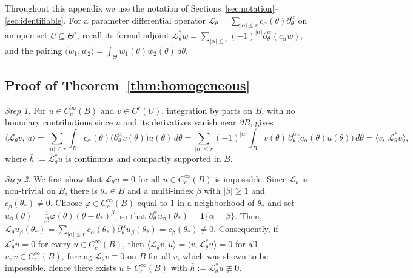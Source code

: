 \documentclass[11pt,twoside]{article} %
\begin{document}
Throughout this appendix we use the notation of Sections~\ref{sec:notation}--\ref{sec:identifiable}.
For a parameter differential operator $\mathcal L_\theta=\sum_{|\alpha|\le r}c_\alpha(\theta)\partial^\alpha_\theta$
on an open set $U\subseteq\Theta^\circ$, recall its formal adjoint
$\mathcal L^*_\theta w=\sum_{|\alpha|\le r}(-1)^{|\alpha|}\partial^\alpha_\theta(c_\alpha w)$,
and the pairing $\langle w_1,w_2\rangle=\int_\Theta w_1(\theta)w_2(\theta)\,d\theta$.

\subsection{Proof of Theorem~\ref{thm:homogeneous}}
\label{app:proof:thm_homogeneous}


\emph{Step 1.}
For $u\in C_c^\infty(B)$ and $v\in C^r(U)$, integration by parts on $B$, with no
boundary contributions since $u$ and its derivatives vanish near $\partial B$, gives
\begin{equation*}
    \langle \mathcal L_\theta v,\,u\rangle
    =\sum_{|\alpha|\le r}\int_B c_\alpha(\theta)\big(\partial^\alpha_\theta v(\theta)\big)u(\theta)\,d\theta
    =\sum_{|\alpha|\le r}(-1)^{|\alpha|}\int_B v(\theta)\,\partial^\alpha_\theta\!\big(c_\alpha(\theta)u(\theta)\big)\,d\theta
    =\langle v,\,\mathcal L^*_\theta u\rangle,
\end{equation*}
%
where $\bar h:=\mathcal L^*_\theta u$ is continuous and compactly supported in $B$.

\vspace{0.5 em}
\noindent
\emph{Step 2.}
We first show that $\mathcal L_\theta u=0$ for all $u\in C_c^\infty(B)$ is impossible.
Since $\mathcal L_\theta$ is non-trivial on $B$, there is $\theta_*\in B$ and a multi-index
$\beta$ with $|\beta|\ge1$ and $c_\beta(\theta_*)\ne0$. Choose $\varphi\in C_c^\infty(B)$
equal to $1$ in a neighborhood of $\theta_*$ and set $u_\beta(\theta)=\frac{1}{\beta!}
\varphi(\theta)(\theta-\theta_*)^\beta$,
so that $\partial^\alpha_\theta u_\beta(\theta_*)=\mathbf 1\{\alpha=\beta\}$. Then,
$\mathcal L_\theta u_\beta(\theta_*)=\sum_{|\alpha|\le r}c_\alpha(\theta_*)\partial^\alpha_\theta u_\beta(\theta_*)=c_\beta(\theta_*)\ne0$. Consequently, if $\mathcal L^*_\theta u=0$ for every $u\in C_c^\infty(B)$, then
$\langle \mathcal L_\theta v,u\rangle=\langle v,\mathcal L^*_\theta u\rangle=0$ for all $u,v\in C_c^\infty(B)$,
forcing $\mathcal L_\theta v\equiv0$ on $B$ for all $v$, which was shown to be impossible. Hence there exists
$u\in C_c^\infty(B)$ with $\bar h:=\mathcal L^*_\theta u\not\equiv0$.
\end{document}
